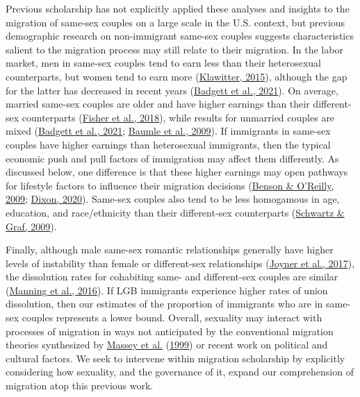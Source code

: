 \documentclass[
  12pt,
]{article}
\begin{document}
Previous scholarship has not explicitly applied these analyses and insights to the migration of same-sex couples on a large scale in the U.S. context, but previous demographic research on non-immigrant same-sex couples suggests characteristics salient to the migration process may still relate to their migration. In the labor market, men in same-sex couples tend to earn less than their heterosexual counterparts, but women tend to earn more (\protect\hyperlink{ref-klawitter_2015}{Klawitter, 2015}), although the gap for the latter has decreased in recent years (\protect\hyperlink{ref-badgett_2021_lgbtq}{Badgett et al., 2021}). On average, married same-sex couples are older and have higher earnings than their different-sex counterparts (\protect\hyperlink{ref-fisher_2018}{Fisher et al., 2018}), while results for unmarried couples are mixed (\protect\hyperlink{ref-badgett_2021_lgbtq}{Badgett et al., 2021}; \protect\hyperlink{ref-baumle_2009}{Baumle et al., 2009}). If immigrants in same-sex couples have higher earnings than heterosexual immigrants, then the typical economic push and pull factors of immigration may affect them differently. As discussed below, one difference is that these higher earnings may open pathways for lifestyle factors to influence their migration decisions (\protect\hyperlink{ref-benson_2009}{Benson \& O'Reilly, 2009}; \protect\hyperlink{ref-dixon_2020}{Dixon, 2020}). Same-sex couples also tend to be less homogamous in age, education, and race/ethnicity than their different-sex counterparts (\protect\hyperlink{ref-schwartz_2009}{Schwartz \& Graf, 2009}).

Finally, although male same-sex romantic relationships generally have higher levels of instability than female or different-sex relationships (\protect\hyperlink{ref-joyner_2017}{Joyner et al., 2017}), the dissolution rates for cohabiting same- and different-sex couples are similar (\protect\hyperlink{ref-manning_2016}{Manning et al., 2016}). If LGB immigrants experience higher rates of union dissolution, then our estimates of the proportion of immigrants who are in same-sex couples represents a lower bound. Overall, sexuality may interact with processes of migration in ways not anticipated by the conventional migration theories synthesized by \protect\hyperlink{ref-massey_1999}{Massey et al.} (\protect\hyperlink{ref-massey_1999}{1999}) or recent work on political and cultural factors. We seek to intervene within migration scholarship by explicitly considering how sexuality, and the governance of it, expand our comprehension of migration atop this previous work.
\end{document}
